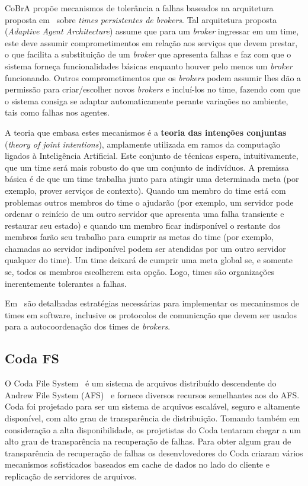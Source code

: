 CoBrA propõe mecanismos de tolerância a falhas baseados na arquitetura proposta em~\cite{kumar2000adaptive} sobre \emph{times persistentes de brokers}. Tal arquitetura proposta (\emph{Adaptive Agent Architecture}) assume que para um \emph{broker} ingressar em um time, este deve assumir comprometimentos em relação aos serviços que devem prestar, o que facilita a substituição de um \emph{broker} que apresenta falhas e faz com que o sistema forneça funcionalidades básicas enquanto houver pelo menos um \emph{broker} funcionando. Outros comprometimentos que os \emph{brokers} podem assumir lhes dão a permissão para criar/escolher novos \emph{brokers} e incluí-los no time, fazendo com que o sistema consiga se adaptar automaticamente perante variações no ambiente, tais como falhas nos agentes. 

A teoria que embasa estes mecanismos é a \textbf{teoria das intenções conjuntas} (\emph{theory of joint intentions}), amplamente utilizada em ramos da computação ligados à Inteligência Artificial. Este conjunto de técnicas espera, intuitivamente, que um time será mais robusto do que um conjunto de indivíduos. A premissa básica é de que um time trabalha junto para atingir uma determinada meta (por exemplo, prover serviços de contexto). Quando um membro do time está com problemas outros membros do time o ajudarão (por exemplo, um servidor pode ordenar o reinício de um outro servidor que apresenta uma falha transiente e restaurar seu estado) e quando um membro ficar indisponível o restante dos membros farão seu trabalho para cumprir as metas do time (por exemplo, chamadas ao servidor indiponível podem ser atendidas por um outro servidor qualquer do time). Um time deixará de cumprir uma meta global se, e somente se, todos os membros escolherem esta opção. Logo, times são organizações inerentemente tolerantes a falhas.

Em~\cite{kumar2000adaptive} são detalhadas estratégias necessárias para implementar os mecaninsmos de times em software, inclusive os protocolos de comunicação que devem ser usados para a autocoordenação dos times de \emph{brokers}.


\subsection{Coda FS} %
\label{sub:coda_fs}

O Coda File System~\cite{satyanarayanan1990coda} é um sistema de arquivos distribuído descendente do Andrew File System (AFS)~\cite{howard1988overview} e fornece diversos recursos semelhantes aos do AFS. Coda foi projetado para ser um sistema de arquivos escalável, seguro e altamente disponível, com alto grau de transparência de distribuição. Tomando também em consideração a alta disponibilidade, os projetistas do Coda tentaram chegar a um alto grau de transparência na recuperação de falhas. Para obter algum grau de transparência de recuperação de falhas os desenvlovedores do Coda criaram vários mecanismos sofisticados baseados em cache de dados no lado do cliente e replicação de servidores de arquivos.

